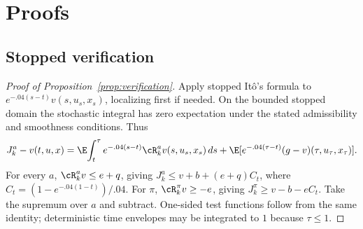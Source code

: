 \section{Proofs}\label{app:proofs}
\subsection{Stopped verification}
\begin{proof}[Proof of Proposition~\ref{prop:verification}]
Apply stopped It\^o's formula to $e^{-.04(s-t)}v(s,u_s,x_s)$, localizing first if needed. On the bounded stopped domain the stochastic integral has zero expectation under the stated admissibility and smoothness conditions. Thus
\[
 J_k^a-v(t,u,x)=\E\!\int_t^\tau e^{-.04(s-t)}\cR_k^av(s,u_s,x_s)\,ds
 +\E[e^{-.04(\tau-t)}(g-v)(\tau,u_\tau,x_\tau)].
\]
For every $a$, $\cR_k^av\leq e+q$, giving $J_k^a\leq v+b+(e+q)C_t$, where $C_t=(1-e^{-.04(1-t)})/.04$. For $\pi$, $\cR_k^\pi v\geq-e$, giving $J_k^\pi\geq v-b-eC_t$. Take the supremum over $a$ and subtract. One-sided test functions follow from the same identity; deterministic time envelopes may be integrated to $1$ because $\tau\leq1$.
\end{proof}

